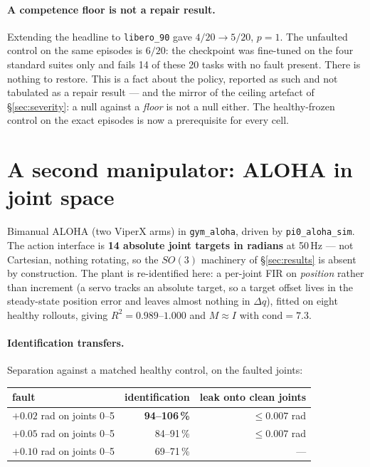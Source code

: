 \documentclass[11pt,a4paper]{article}
\newcommand{\code}[1]{\texttt{\small #1}}
\begin{document}
\paragraph{A competence floor is not a repair result.}
Extending the headline to \code{libero\_90} gave $4/20 \to 5/20$, $p=1$. The unfaulted
control on the same episodes is $6/20$: the checkpoint was fine-tuned on the four standard
suites only and fails 14 of these 20 tasks with no fault present. There is nothing to
restore. This is a fact about the policy, reported as such and not tabulated as a repair
result --- and the mirror of the ceiling artefact of \S\ref{sec:severity}: a null against a
\emph{floor} is not a null either. The healthy-frozen control on the exact episodes is now
a prerequisite for every cell.

\section{A second manipulator: ALOHA in joint space}
\label{sec:aloha}

Bimanual ALOHA (two ViperX arms) in \code{gym\_aloha}, driven by \code{pi0\_aloha\_sim}. The
action interface is \textbf{14 absolute joint targets in radians} at 50\,Hz --- not Cartesian,
nothing rotating, so the $SO(3)$ machinery of \S\ref{sec:results} is absent by construction.
The plant is re-identified here: a per-joint FIR on \emph{position} rather than increment
(a servo tracks an absolute target, so a target offset lives in the steady-state position
error and leaves almost nothing in $\Delta q$), fitted on eight healthy rollouts, giving
$R^2 = 0.989$--$1.000$ and $M \approx I$ with $\mathrm{cond} = 7.3$.

\paragraph{Identification transfers.}
Separation against a matched healthy control, on the faulted joints:

\begin{center}
\begin{tabular}{lrr}
\toprule
fault & identification & leak onto clean joints \\
\midrule
$+0.02$ rad on joints 0--5 & \textbf{94--106\,\%} & $\leq 0.007$ rad \\
$+0.05$ rad on joints 0--5 & 84--91\,\% & $\leq 0.007$ rad \\
$+0.10$ rad on joints 0--5 & 69--71\,\% & --- \\
\bottomrule
\end{tabular}
\end{center}
\end{document}
